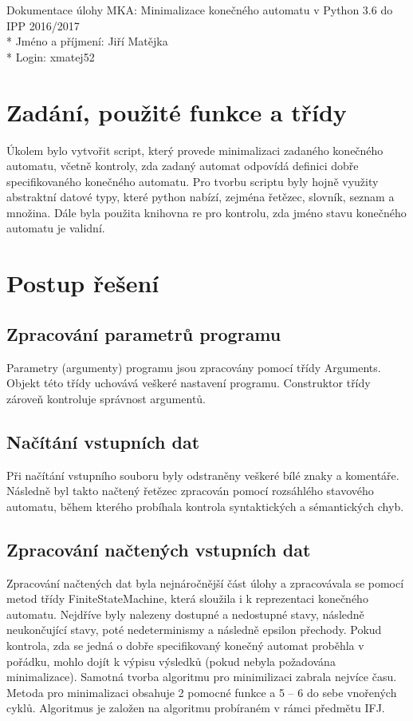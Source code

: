 \documentclass[a4paper, 10pt]{article}
\begin{document}
    \noindent
    Dokumentace úlohy MKA: Minimalizace konečného automatu v Python 3.6 do IPP 2016/2017 \\*
    Jméno a příjmení: Jiří Matějka \\*
    Login: xmatej52

    \section{Zadání, použité funkce a třídy}
        Úkolem bylo vytvořit script, který provede minimalizaci zadaného konečného automatu,
        včetně kontroly, zda zadaný automat odpovídá definici dobře specifikovaného
        konečného automatu.
        Pro tvorbu scriptu byly hojně využity abstraktní datové typy, které python
        nabízí, zejména řetězec, slovník, seznam a množina. Dále byla použita knihovna
        re pro kontrolu, zda jméno stavu konečného automatu je validní.
    \section{Postup řešení}
        \subsection{Zpracování parametrů programu}
            Parametry (argumenty) programu jsou zpracovány pomocí třídy Arguments.
            Objekt této třídy uchovává veškeré nastavení programu. Construktor třídy
            zároveň kontroluje správnost argumentů.
        \subsection{Načítání vstupních dat}
            Při načítání vstupního souboru byly odstraněny veškeré bílé znaky a
            komentáře. Následně byl takto načtený řetězec zpracován pomocí rozsáhlého
            stavového automatu, během kterého probíhala kontrola syntaktických a
            sémantických chyb.
        \subsection{Zpracování načtených vstupních dat}
            Zpracování načtených dat byla nejnáročnější část úlohy a zpracovávala
            se pomocí metod třídy FiniteStateMachine, která sloužila i k reprezentaci
            konečného automatu. Nejdříve byly
            nalezeny dostupné a nedostupné stavy, následně neukončující stavy, poté
            nedeterminismy a následně epsilon přechody. Pokud kontrola, zda se jedná
            o dobře specifikovaný konečný automat proběhla v pořádku, mohlo dojít
            k výpisu výsledků (pokud nebyla požadována minimalizace). Samotná tvorba
            algoritmu pro minimilizaci zabrala nejvíce času. Metoda pro minimalizaci
            obsahuje 2 pomocné funkce a 5 -- 6 do sebe vnořených cyklů. Algoritmus
            je založen na algoritmu probíraném v rámci předmětu IFJ.
\end{document}

